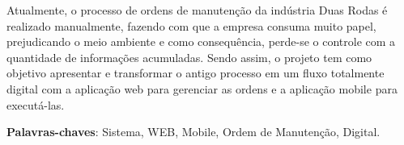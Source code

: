 %
%
%
%


%
% 
%






\begin{resumo}
	Atualmente, o processo de ordens de manutenção da indústria Duas Rodas é realizado manualmente, fazendo com que a empresa consuma muito papel, prejudicando o meio ambiente e como consequência, perde-se o controle com a quantidade de informações acumuladas. Sendo assim, o projeto tem como objetivo apresentar e transformar o antigo processo em um fluxo totalmente digital com a aplicação web para gerenciar as ordens e a aplicação mobile para executá-las.
	
	\vspace{\onelineskip}
	
	\noindent
	\textbf{Palavras-chaves}: Sistema, WEB, Mobile, Ordem de Manutenção, Digital.
\end{resumo}

